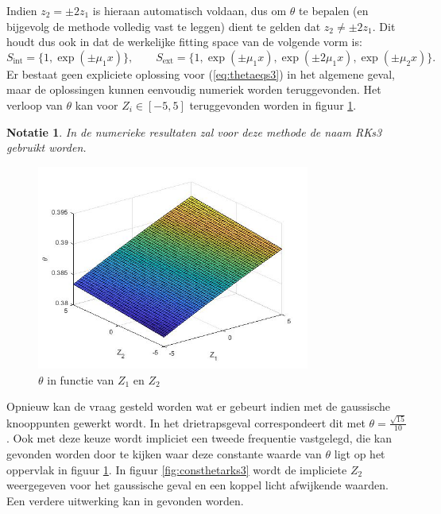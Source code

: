 \documentclass[12pt]{article}
\newtheorem{nta}[defn]{Notatie}
\begin{document}
Indien \(z_2=\pm2z_1\) is hieraan automatisch voldaan, dus om \(\theta\) te bepalen (en bijgevolg de methode volledig vast te leggen) dient te gelden dat \(z_2\ne\pm2z_1\). Dit houdt dus ook in dat de werkelijke fitting space van de volgende vorm is:
\[S_{\textrm{int}}=\{1,\exp(\pm\mu_1x)\},\qquad S_{\textrm{ext}}=\{1,\exp(\pm\mu_1x),\exp(\pm2\mu_1x),\exp(\pm\mu_2x)\}.\]
Er bestaat geen expliciete oplossing voor (\ref{eq:thetaeqs3}) in het algemene geval, maar de oplossingen kunnen eenvoudig numeriek worden teruggevonden. Het verloop van \(\theta\) kan voor \(Z_i\in[-5,5]\) teruggevonden worden in figuur \ref{fig:thetagraphs3}.
\begin{nta}
In de numerieke resultaten zal voor deze methode de naam RKs3 gebruikt worden.
\end{nta}
\begin{figure}[H]
    \centering
    \includegraphics[width=0.8\textwidth]{thetagraphs3.jpg}
    \caption{\(\theta\) in functie van \(Z_1\) en \(Z_2\)}
    \label{fig:thetagraphs3}
\end{figure}
Opnieuw kan de vraag gesteld worden wat er gebeurt indien met de gaussische knooppunten gewerkt wordt. In het drietrapsgeval correspondeert dit met \(\theta=\frac{\sqrt{15}}{10}\). Ook met deze keuze wordt impliciet een tweede frequentie vastgelegd, die kan gevonden worden door te kijken waar deze constante waarde van \(\theta\) ligt op het oppervlak in figuur \ref{fig:thetagraphs3}. In figuur \ref{fig:consthetarks3} wordt de impliciete \(Z_2\) weergegeven voor het gaussische geval en een koppel licht afwijkende waarden. Een verdere uitwerking kan in \cite{6thordersympl} gevonden worden.
\end{document}
